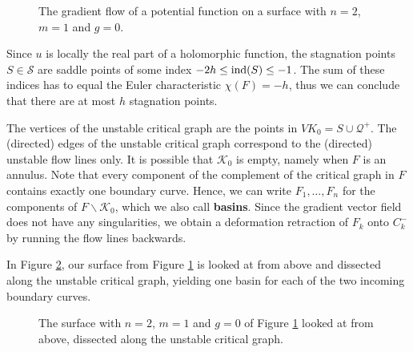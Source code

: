 \begin{figure}[ht]
    \centering
    \def\svgwidth{.7\columnwidth}
    
    \caption{
        \label{trousers}
        The gradient flow of a potential function on a surface with $n = 2$, $m = 1$ and $g = 0$.}
\end{figure}

Since $u$ is locally the real part of a holomorphic function,
the stagnation points $S \in \mathcal S$ are saddle points of some index $-2h \leq \operatorname{ind}(S) \leq -1$.
The sum of these indices has to equal the Euler characteristic $\chi(F)= -h$, 
thus we can conclude that there are at most $h$ stagnation points.

The vertices of the unstable critical graph are the points in $VK_0 = S \cup \mathcal Q^+$.
The (directed) edges of the unstable critical graph correspond to the (directed) unstable flow lines only.
It is possible that $\mathcal K_0$ is empty, namely when $F$ is an annulus.
Note that every component of the complement of the critical graph in $F$ contains exactly one boundary curve.
Hence, we can write $F_1, \dotsc, F_n$ for the components of $F \backslash \mathcal K_0$, which we also call \textbf{basins}.
Since the gradient vector field does not have any singularities,
we obtain a deformation retraction of $F_k$ onto $C^-_k$ by running the flow lines backwards.

In Figure \ref{trousers_flat}, our surface from Figure \ref{trousers} is looked at from above and dissected along the unstable critical graph,
yielding one basin for each of the two incoming boundary curves.

\begin{figure}[ht]
    \centering
    \def\svgwidth{.7\columnwidth}
    
    \caption{
        \label{trousers_flat}
        The surface with $n = 2$, $m = 1$ and $g = 0$ of Figure \ref{trousers} looked at from above, dissected along the unstable critical graph.}
\end{figure}

